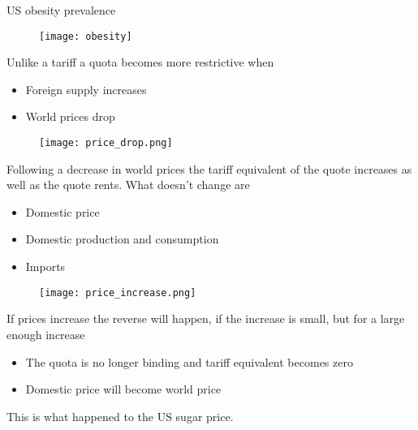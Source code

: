 \documentclass{beamer}
\begin{document}
\begin{frame}{US obesity prevalence}
  \begin{figure}
    \texttt{[image: obesity]}
  \end{figure}
\end{frame}

\begin{frame}
  Unlike a tariff a quota becomes more restrictive when
  \begin{itemize}
    \item Foreign supply increases
    \item World prices drop
  \end{itemize}
\end{frame}

\begin{frame}
  \begin{figure}
    \texttt{[image: price\_drop.png]}
  \end{figure}
\end{frame}

\begin{frame}
 Following a decrease in world prices the tariff equivalent of the quote increases as well as the quote rents. 
 What doesn't change are
 \begin{itemize}
   \item Domestic price
   \item Domestic production and consumption
   \item Imports   
 \end{itemize}
 \end{frame}

\begin{frame}
  \begin{figure}
    \texttt{[image: price\_increase.png]}
  \end{figure}
\end{frame}

\begin{frame}
 If prices increase the reverse will happen, if the increase is small, but for a large enough increase
 \begin{itemize}
   \item The quota is no longer binding and tariff equivalent becomes zero
   \item Domestic price will become world price
 \end{itemize}
 \medskip
 This is what happened to the US sugar price.
\end{frame}
\end{document}
